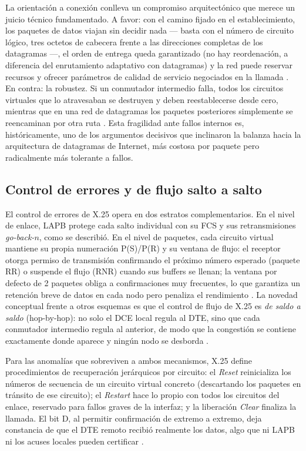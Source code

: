 \documentclass[12pt,a4paper]{article}
\begin{document}
La orientación a conexión conlleva un compromiso arquitectónico que merece un juicio técnico fundamentado. A favor: con el camino fijado en el establecimiento, los paquetes de datos viajan sin decidir nada --- basta con el número de circuito lógico, tres octetos de cabecera frente a las direcciones completas de los datagramas ---, el orden de entrega queda garantizado (no hay reordenación, a diferencia del enrutamiento adaptativo con datagramas) y la red puede reservar recursos y ofrecer parámetros de calidad de servicio negociados en la llamada \cite{bertsekas1992}. En contra: la robustez. Si un conmutador intermedio falla, todos los circuitos virtuales que lo atravesaban se destruyen y deben reestablecerse desde cero, mientras que en una red de datagramas los paquetes posteriores simplemente se reencaminan por otra ruta \cite{tanenbaum2012}. Esta fragilidad ante fallos internos es, históricamente, uno de los argumentos decisivos que inclinaron la balanza hacia la arquitectura de datagramas de Internet, más costosa por paquete pero radicalmente más tolerante a fallos.

\subsection{Control de errores y de flujo salto a salto}

El control de errores de X.25 opera en dos estratos complementarios. En el nivel de enlace, LAPB protege cada salto individual con su FCS y sus retransmisiones \emph{go-back-$n$}, como se describió. En el nivel de paquetes, cada circuito virtual mantiene su propia numeración P(S)/P(R) y su ventana de flujo: el receptor otorga permiso de transmisión confirmando el próximo número esperado (paquete RR) o suspende el flujo (RNR) cuando sus buffers se llenan; la ventana por defecto de 2 paquetes obliga a confirmaciones muy frecuentes, lo que garantiza un retención breve de datos en cada nodo pero penaliza el rendimiento \cite{itux25, stallings2004}. La novedad conceptual frente a otros esquemas es que el control de flujo de X.25 es \emph{de saldo a saldo} (hop-by-hop): no solo el DCE local regula al DTE, sino que cada conmutador intermedio regula al anterior, de modo que la congestión se contiene exactamente donde aparece y ningún nodo se desborda \cite{schwartz1987, bertsekas1992}.

Para las anomalías que sobreviven a ambos mecanismos, X.25 define procedimientos de recuperación jerárquicos por circuito: el \emph{Reset} reinicializa los números de secuencia de un circuito virtual concreto (descartando los paquetes en tránsito de ese circuito); el \emph{Restart} hace lo propio con todos los circuitos del enlace, reservado para fallos graves de la interfaz; y la liberación \emph{Clear} finaliza la llamada. El bit D, al permitir confirmación de extremo a extremo, deja constancia de que el DTE remoto recibió realmente los datos, algo que ni LAPB ni los acuses locales pueden certificar \cite{itux25, rybczynski1980}.
\end{document}
